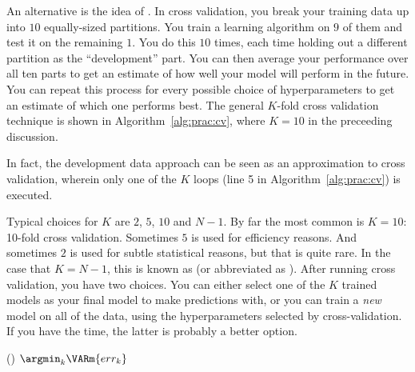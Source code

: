 An alternative is the idea of .  In cross
validation, you break your training data up into $10$ equally-sized
partitions.  You train a learning algorithm on $9$ of them and test it
on the remaining $1$.  You do this $10$ times, each time holding out a
different partition as the ``development'' part.  You can then average
your performance over all ten parts to get an estimate of how well
your model will perform in the future.  You can repeat this process
for every possible choice of hyperparameters to get an estimate of
which one performs best.  The general $K$-fold cross validation
technique is shown in Algorithm~\ref{alg:prac:cv}, where $K=10$ in the
preceeding discussion.

In fact, the development data approach can be seen as an approximation
to cross validation, wherein only one of the $K$ loops (line 5 in
Algorithm~\ref{alg:prac:cv}) is executed.

Typical choices for $K$ are $2$, $5$, $10$ and $N-1$.  By far the most
common is $K=10$: 10-fold cross validation.  Sometimes $5$ is used for
efficiency reasons.  And sometimes $2$ is used for subtle statistical
reasons, but that is quite rare.  In the case that $K=N-1$, this is
known as  (or abbreviated as
).  After running cross validation, you
have two choices.  You can either select one of the $K$ trained models
as your final model to make predictions with, or you can train a
\emph{new} model on all of the data, using the hyperparameters
selected by cross-validation.  If you have the time, the latter is
probably a better option.

%
  {()}
  {
\ENDIF
\ENDFOR
\ENDFOR
\RETURN $\argmin_k \VARm{err_k}$
}

